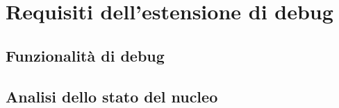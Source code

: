 \chapter{Requisiti dell'estensione di debug}
\section{Funzionalità di debug}
\section{Analisi dello stato del nucleo}
